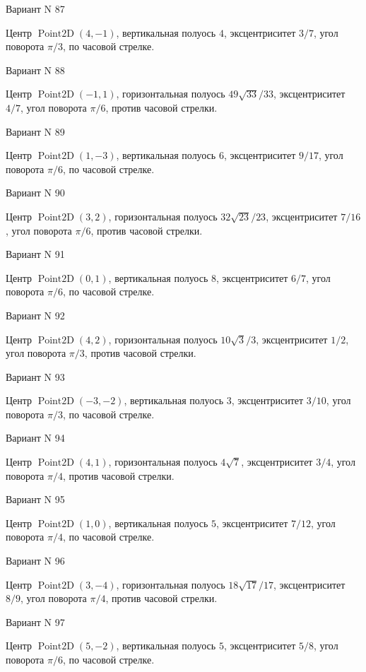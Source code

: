 \documentclass[11pt]{report}
\begin{document}
Вариант N 87

Центр $\operatorname{Point2D}\left(4, -1\right)$, вертикальная полуось $4$, эксцентриситет $3 / 7$, угол поворота $\pi / 3$, по часовой стрелке.

Вариант N 88

Центр $\operatorname{Point2D}\left(-1, 1\right)$, горизонтальная полуось $49 \sqrt{33} / 33$, эксцентриситет $4 / 7$, угол поворота $\pi / 6$, против часовой стрелки.

Вариант N 89

Центр $\operatorname{Point2D}\left(1, -3\right)$, вертикальная полуось $6$, эксцентриситет $9 / 17$, угол поворота $\pi / 6$, по часовой стрелке.

Вариант N 90

Центр $\operatorname{Point2D}\left(3, 2\right)$, горизонтальная полуось $32 \sqrt{23} / 23$, эксцентриситет $7 / 16$, угол поворота $\pi / 6$, против часовой стрелки.

Вариант N 91

Центр $\operatorname{Point2D}\left(0, 1\right)$, вертикальная полуось $8$, эксцентриситет $6 / 7$, угол поворота $\pi / 6$, по часовой стрелке.

Вариант N 92

Центр $\operatorname{Point2D}\left(4, 2\right)$, горизонтальная полуось $10 \sqrt{3} / 3$, эксцентриситет $1 / 2$, угол поворота $\pi / 3$, против часовой стрелки.

Вариант N 93

Центр $\operatorname{Point2D}\left(-3, -2\right)$, вертикальная полуось $3$, эксцентриситет $3 / 10$, угол поворота $\pi / 3$, по часовой стрелке.

Вариант N 94

Центр $\operatorname{Point2D}\left(4, 1\right)$, горизонтальная полуось $4 \sqrt{7}$, эксцентриситет $3 / 4$, угол поворота $\pi / 4$, против часовой стрелки.

Вариант N 95

Центр $\operatorname{Point2D}\left(1, 0\right)$, вертикальная полуось $5$, эксцентриситет $7 / 12$, угол поворота $\pi / 4$, по часовой стрелке.

Вариант N 96

Центр $\operatorname{Point2D}\left(3, -4\right)$, горизонтальная полуось $18 \sqrt{17} / 17$, эксцентриситет $8 / 9$, угол поворота $\pi / 4$, против часовой стрелки.

Вариант N 97

Центр $\operatorname{Point2D}\left(5, -2\right)$, вертикальная полуось $5$, эксцентриситет $5 / 8$, угол поворота $\pi / 6$, по часовой стрелке.
\end{document}
